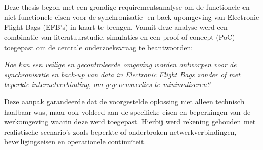 
\chapter{}%
\label{ch:methodologie}


Deze thesis begon met een grondige requirementsanalyse om de functionele en niet-functionele eisen voor de synchronisatie- en back-upomgeving van Electronic Flight Bags (EFB's) in kaart te brengen. Vanuit deze analyse werd een combinatie van literatuurstudie, simulaties en een proof-of-concept (PoC) toegepast om de centrale onderzoeksvraag te beantwoorden:

\textit{Hoe kan een veilige en gecontroleerde omgeving worden ontworpen voor de synchronisatie en back-up van data in Electronic Flight Bags zonder of met beperkte internetverbinding, om gegevensverlies te minimaliseren?}

Deze aanpak garandeerde dat de voorgestelde oplossing niet alleen technisch haalbaar was, maar ook voldeed aan de specifieke eisen en beperkingen van de werkomgeving waarin deze werd toegepast. Hierbij werd rekening gehouden met realistische scenario’s zoals beperkte of onderbroken netwerkverbindingen, beveiligingseisen en operationele continuïteit.

